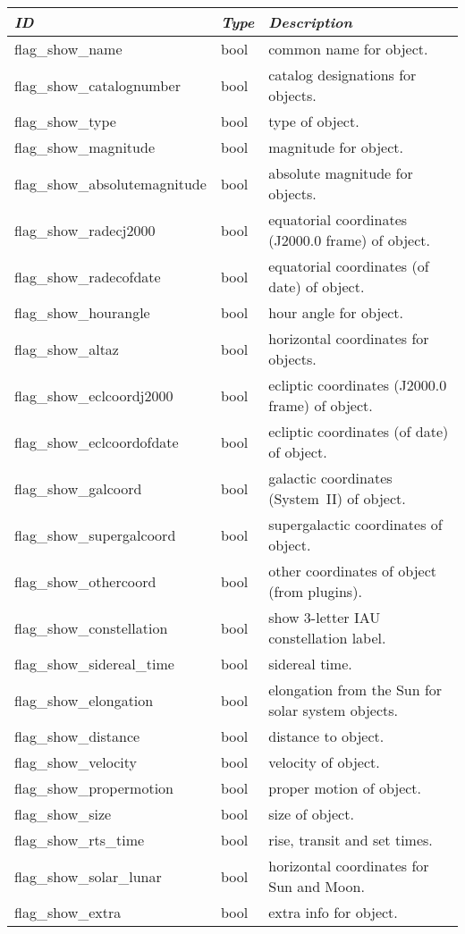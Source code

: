 \begin{longtable}{l|l|l}\toprule
\emph{ID} & \emph{Type} & \emph{Description}\\\midrule
flag\_show\_name              & bool & common name for object.\\
flag\_show\_catalognumber     & bool & catalog designations for objects.\\
flag\_show\_type              & bool & type of object.\\
flag\_show\_magnitude         & bool & magnitude for object.\\
flag\_show\_absolutemagnitude & bool & absolute magnitude for objects.\\
flag\_show\_radecj2000        & bool & equatorial coordinates (J2000.0 frame) of object.\\
flag\_show\_radecofdate       & bool & equatorial coordinates (of date) of object.\\
flag\_show\_hourangle         & bool & hour angle for object.\\
flag\_show\_altaz             & bool & horizontal coordinates for objects.\\
flag\_show\_eclcoordj2000     & bool & ecliptic coordinates (J2000.0 frame) of object.\\
flag\_show\_eclcoordofdate    & bool & ecliptic coordinates (of date) of object.\\
flag\_show\_galcoord          & bool & galactic coordinates (System~II) of object.\\
flag\_show\_supergalcoord     & bool & supergalactic coordinates of object.\\
flag\_show\_othercoord        & bool & other coordinates of object (from plugins).\\
flag\_show\_constellation     & bool & show 3-letter IAU\index{IAU} constellation label.\\
flag\_show\_sidereal\_time    & bool & sidereal time.\\
flag\_show\_elongation        & bool & elongation from the Sun for solar system objects.\\
flag\_show\_distance          & bool & distance to object.\\
flag\_show\_velocity          & bool & velocity of object.\\
flag\_show\_propermotion      & bool & proper motion of object.\\
flag\_show\_size              & bool & size of object.\\
flag\_show\_rts\_time         & bool & rise, transit and set times.\\
flag\_show\_solar\_lunar      & bool & horizontal coordinates for Sun and Moon.\\
flag\_show\_extra             & bool & extra info for object.\\\bottomrule
\end{longtable}

